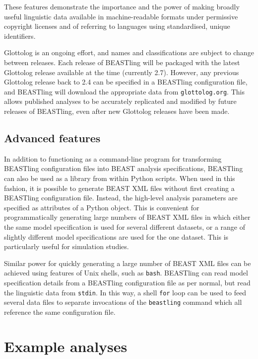 \documentclass[twocolumn,10pt]{scrartcl}
\begin{document}
These features demonstrate the importance and the power of making broadly useful linguistic data available in machine-readable formats under permissive copyright licenses and of referring to languages using standardised, unique identifiers.

Glottolog is an ongoing effort, and names and classifications are subject to change between releases.  Each release of BEASTling will be packaged with the latest Glottolog release available at the time (currently 2.7).  However, any previous Glottolog release back to 2.4 can be specified in a BEASTling configuration file, and BEASTling will download the appropriate data from \texttt{glottolog.org}.  This allows published analyses to be accurately replicated and modified by future releases of BEASTling, even after new Glottolog releases have been made.

\subsection{Advanced features}

In addition to functioning as a command-line program for transforming BEASTling configuration files into BEAST analysis specifications, BEASTling can also be used as a library from within Python scripts.  When used in this fashion, it is possible to generate BEAST XML files without first creating a BEASTling configuration file.  Instead, the high-level analysis parameters are specified as attributes of a Python object.  This is convenient for programmatically generating large numbers of BEAST XML files in which either the same model specification is used for several different datasets, or a range of slightly different model specifications are used for the one dataset.  This is particularly useful for simulation studies.

Similar power for quickly generating a large number of BEAST XML files can be achieved using features of Unix shells, such as \texttt{bash}.  BEASTling can read model specification details from a BEASTling configuration file as per normal, but read the linguistic data from \texttt{stdin}.  In this way, a shell \texttt{for} loop can be used to feed several data files to separate invocations of the \texttt{beastling} command which all reference the same configuration file.

\section{Example analyses}
\end{document}

